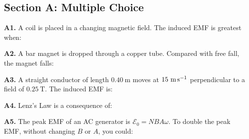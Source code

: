 \newpage
\begin{exercisebox}[26]

\subsection*{Section A: Multiple Choice}

\textbf{A1.} A coil is placed in a changing magnetic
field. The induced EMF is greatest when:


\vspace{0.4cm}

\textbf{A2.} A bar magnet is dropped through a
copper tube. Compared with free fall, the magnet
falls:


\vspace{0.4cm}

\textbf{A3.} A straight conductor of length
$0.40\ \text{m}$ moves at $15\ \text{m\,s}^{-1}$
perpendicular to a field of $0.25\ \text{T}$. The
induced EMF is:


\vspace{0.4cm}

\textbf{A4.} Lenz's Law is a consequence of:


\vspace{0.4cm}

\textbf{A5.} The peak EMF of an AC generator is
$\mathcal{E}_0 = NBA\omega$. To double the peak
EMF, without changing $B$ or $A$, you could:



\end{exercisebox}

